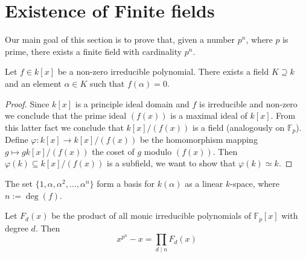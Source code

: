 \section{Existence of Finite fields}

\begin{remark}
    Our main goal of this section is to prove that, given a number \(p^n\), where
    \(p\) is prime, there exists a finite field with cardinality \(p^n\).
\end{remark}

\begin{proposition}
    Let \(f \in k[x]\) be a non-zero irreducible polynomial. There exists a field \(K
    \supseteq k\) and an element \(\alpha \in K\) such that \(f(\alpha) = 0\).
\end{proposition}

\begin{proof}
    Since \(k[x]\) is a principle ideal domain and \(f\) is irreducible and
    non-zero we conclude that the prime ideal \((f(x))\) is a maximal ideal of
    \(k[x]\). From this latter fact we conclude that \(k[x]/(f(x))\) is a
    field (analogously on \(\mathbb{F}_p\)). Define \(\varphi : k[x] \to
    k[x]/(f(x))\) be the homomorphism mapping \(g \mapsto g k[x]/(f(x))\) the
    coset of \(g\) modulo \((f(x))\). Then \(\varphi(k) \subseteq k[x]/(f(x))\)
    is a subfield, we want to show that \(\varphi(k) \simeq k\).
\end{proof}

\begin{proposition}\label{prop: basis fini}
    The set \(\{1, \alpha, \alpha^2, \dots, \alpha^n\} \) form a basis for
    \(k(\alpha)\) as a linear \(k\)-space, where \(n := \deg(f)\).
\end{proposition}

\begin{proposition}
    Let \(F_d(x)\) be the product of all monic irreducible polynomials of
    \(\mathbb{F}_p[x]\) with degree \(d\). Then
    \[
        x^{p^n} - x = \prod_{d \mid n} F_d(x)
    \]
\end{proposition}


